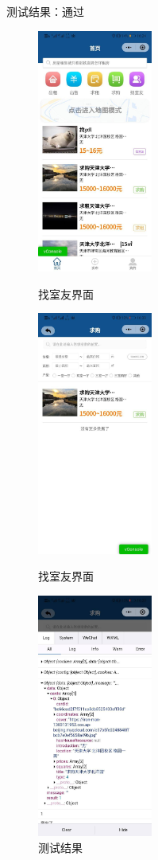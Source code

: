测试结果：通过
\begin{figure}[htbp]
    \centering
    \begin{minipage}[t]{0.32\textwidth}
        \centering
        \includegraphics[width=3.8cm,height=8cm]{test/image/test16.png} 
       \caption{找室友界面} 
        \end{minipage}
    \begin{minipage}[t]{0.32\textwidth}
    \centering
    \includegraphics[width=3.8cm,height=8cm]{test/image/test17.png} 
   \caption{找室友界面} 
    \end{minipage}
    \begin{minipage}[t]{0.32\textwidth}
    \centering
    \includegraphics[width=3.8cm,height=8cm]{test/image/test18.png}
    \caption{测试结果}
    \end{minipage}
    \end{figure}
   \newpage 


